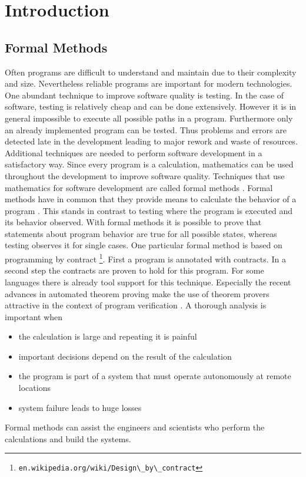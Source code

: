 \chapter{Introduction}

\section{Formal Methods}
Often programs are difficult to understand and maintain due to their
complexity and size. Nevertheless reliable programs are important for
modern technologies. 
One abundant technique to improve software quality is testing. In the
case of software, testing is relatively cheap and can be done 
extensively. However it is in general impossible to execute all possible
paths in a program. Furthermore only an already implemented program can
be tested. Thus problems and errors are detected late in the development
leading to major rework and waste of resources. Additional techniques
are needed to perform software development in a satisfactory way.
Since every program is a calculation, mathematics can be used throughout
the development to improve software quality. Techniques that use 
mathematics for software development are called formal methods \cite{fmb}.
Formal methods have in common that they provide means to calculate the
behavior of a program \cite[p. 371]{scs}. This stands in contrast to 
testing where the program is executed and its behavior observed. With
formal methods it is possible to prove that statements about program
behavior are true for all possible states, whereas testing observes it
for single cases.
One particular formal method is based on programming by contract 
\footnote{\verb"en.wikipedia.org/wiki/Design\_by\_contract"}. 
First a program is annotated with contracts. In a second step the 
contracts are proven to hold for this program. For some languages there
is already tool support for this technique. Especially the recent 
advances in automated theorem proving make the use of theorem provers
attractive in the context of program verification \cite{onelogic}.
A thorough analysis is important when
\begin{itemize}
\item the calculation is large and repeating it is painful
\item important decisions depend on the result of the calculation
\item the program is part of a system that must operate autonomously 
at remote locations
\item system failure leads to huge losses
\end{itemize}
Formal methods can assist the engineers and scientists who perform
the calculations and build the systems.

